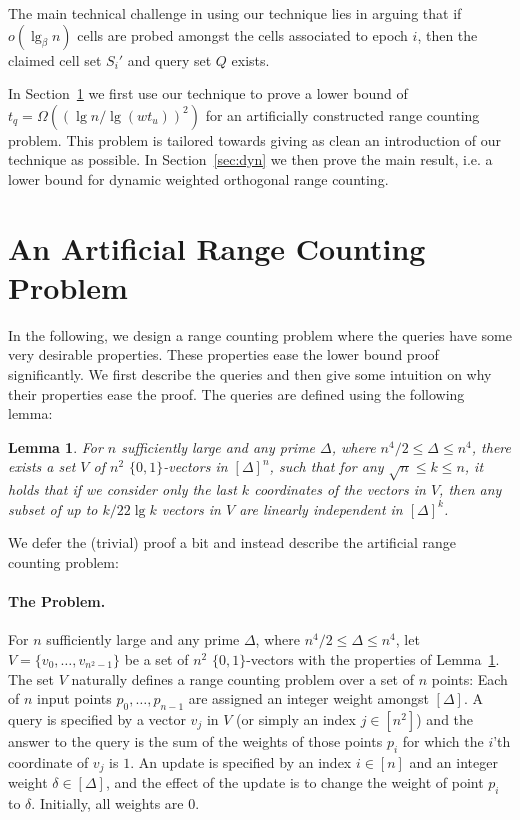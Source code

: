 \documentclass[letterpaper]{article}
\newtheorem{lemma}{Lemma}
\begin{document}
The main technical challenge in using our technique lies in arguing
that if $o(\lg_\beta n)$ cells are probed amongst the cells associated
to epoch $i$, then the claimed cell set $S_i'$ and query set $Q$
exists.

In Section~\ref{sec:ex} we first use our technique to prove a lower
bound of $t_q = \Omega((\lg n/\lg(wt_u))^2)$ for an artificially
constructed range counting problem. This problem is tailored towards
giving as clean an introduction of our technique as possible. In
Section~\ref{sec:dyn} we then prove the main result, i.e. a lower
bound for dynamic weighted orthogonal range counting.

\section{An Artificial Range Counting Problem}
\label{sec:ex}
In the following, we design a range counting problem where the
queries have some very desirable properties. These properties ease the
lower bound proof significantly. We first describe the queries and
then give some intuition on why their properties ease the proof. The
queries are defined using the following lemma:

\begin{lemma}
\label{thm:hardqueries}
For $n$ sufficiently large and any prime $\Delta$, where $n^4/2 \leq
\Delta \leq n^4$, there exists a set $V$ of $n^2$ $\{0,1\}$-vectors in
$[\Delta]^n$, such that for any $\sqrt{n} \leq k \leq n$, it holds
that if we consider only the last $k$ coordinates of the vectors in
$V$, then any subset of up to $k/22\lg k$ vectors in $V$ are linearly
independent in $[\Delta]^k$.
\end{lemma}

We defer the (trivial) proof a bit and instead describe the artificial
range counting problem:

\paragraph{The Problem.}
For $n$ sufficiently large and any prime $\Delta$, where $n^4/2 \leq
\Delta \leq n^4$, let $V=\{v_0,\dots,v_{n^2-1}\}$ be a set of $n^2$
$\{0,1\}$-vectors with the properties of
Lemma~\ref{thm:hardqueries}. The set $V$ naturally defines a range
counting problem over a set of $n$ points: Each of $n$ input points
$p_0,\dots,p_{n-1}$ are assigned an integer weight amongst
$[\Delta]$. A query is specified by a vector $v_j$ in $V$ (or simply
an index $j \in [n^2]$) and the answer to the query is the sum of the
weights of those points $p_i$ for which the $i$'th coordinate of $v_j$
is $1$. An update is specified by an index $i \in [n]$ and an integer
weight $\delta \in [\Delta]$, and the effect of the update is to
change the weight of point $p_i$ to $\delta$. Initially, all weights
are $0$.
\end{document}
